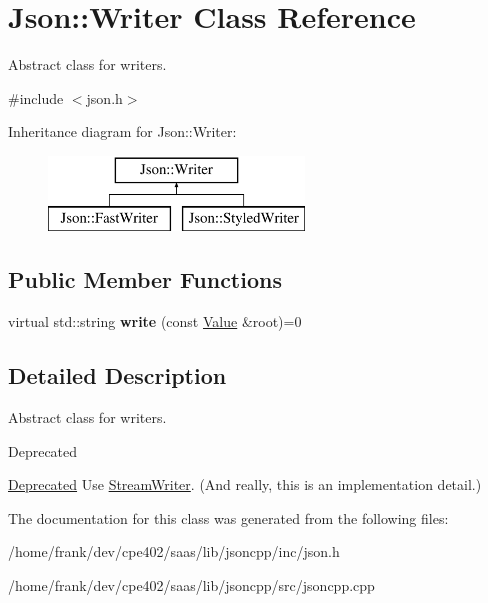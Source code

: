 \hypertarget{class_json_1_1_writer}{}\section{Json\+:\+:Writer Class Reference}
\label{class_json_1_1_writer}


Abstract class for writers.  




{\ttfamily \#include $<$json.\+h$>$}

Inheritance diagram for Json\+:\+:Writer\+:\begin{figure}[H]
\begin{center}
\leavevmode
\includegraphics[height=2.000000cm]{class_json_1_1_writer}
\end{center}
\end{figure}
\subsection*{Public Member Functions}
\begin{DoxyCompactItemize}
\item 
\hypertarget{class_json_1_1_writer_a7b2273a4ffd6f32b369ac8a53b7b5a0d}{}virtual std\+::string {\bfseries write} (const \hyperlink{class_json_1_1_value}{Value} \&root)=0\label{class_json_1_1_writer_a7b2273a4ffd6f32b369ac8a53b7b5a0d}

\end{DoxyCompactItemize}


\subsection{Detailed Description}
Abstract class for writers. 

\begin{DoxyRefDesc}{Deprecated}
\item[\hyperlink{deprecated__deprecated000007}{Deprecated}]Use \hyperlink{class_json_1_1_stream_writer}{Stream\+Writer}. (And really, this is an implementation detail.) \end{DoxyRefDesc}


The documentation for this class was generated from the following files\+:\begin{DoxyCompactItemize}
\item 
/home/frank/dev/cpe402/saas/lib/jsoncpp/inc/json.\+h\item 
/home/frank/dev/cpe402/saas/lib/jsoncpp/src/jsoncpp.\+cpp\end{DoxyCompactItemize}
